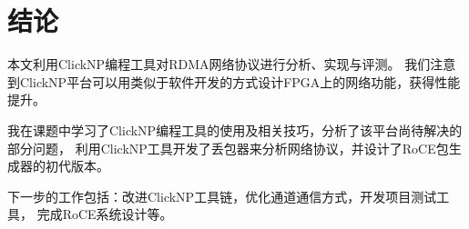 \chapter{结论}
本文利用ClickNP编程工具对RDMA网络协议进行分析、实现与评测。
我们注意到ClickNP平台可以用类似于软件开发的方式设计FPGA上的网络功能，获得性能提升。

我在课题中学习了ClickNP编程工具的使用及相关技巧，分析了该平台尚待解决的部分问题，
利用ClickNP工具开发了丢包器来分析网络协议，并设计了RoCE包生成器的初代版本。

下一步的工作包括：改进ClickNP工具链，优化通道通信方式，开发项目测试工具，
完成RoCE系统设计等。
